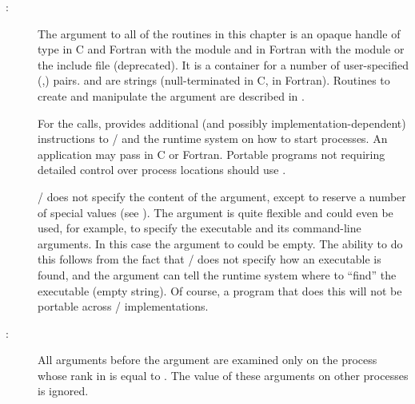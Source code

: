 \begin{description}
\item[:]
The  argument to all of the routines in this
%
chapter is an opaque handle of type 
in C and Fortran with the 
module and
 in Fortran with the  module or the include file  (deprecated).
It is a container for a number of user-specified
(,) pairs.  and  are strings (null-terminated  in
C,  in Fortran). Routines to create and manipulate
the 
argument are described in .


For the  calls,  provides additional (and
possibly implementation-dependent) instructions to \MPI/ and the runtime
system on how to start processes.
An application may pass
 in C or Fortran.  Portable programs not
requiring detailed control over process locations should use
.

\MPI/ does not specify the content of the  argument,
except to reserve a number of special  values
(see ).
The  argument is quite flexible and could even
be used, for example,
to specify the executable and its command-line arguments. In this
case the  argument to  could be
empty.  The ability to do this follows from the fact that \MPI/ does not
specify how an executable is found, and the  argument
can tell the runtime system where to ``find'' the executable
\mpistringskip{} (empty string).
Of course, a program that does
this will not be portable across \MPI/ implementations.

\item[:]
All arguments before the  argument are examined only
on the process whose rank in  is equal to .
The value of these arguments on other processes is ignored.


\end{description}
